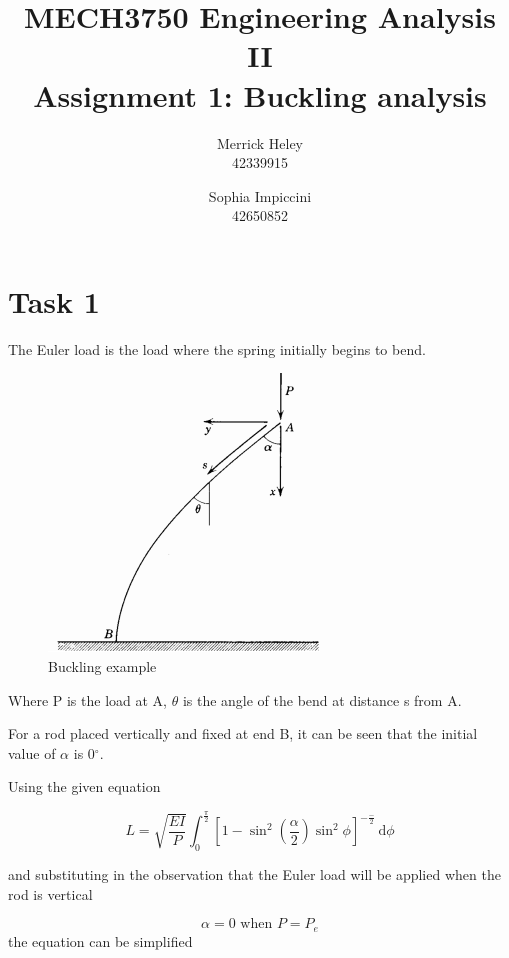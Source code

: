 \documentclass[a4paper,11pt,titlepage]{article}
\title{
MECH3750 Engineering Analysis II \\ 
Assignment 1: Buckling analysis
}
\author{
Merrick Heley\\
42339915
\and
Sophia Impiccini\\
42650852
}
\newcommand{\ud}{\,\mathrm{d}}
\begin{document}
\maketitle

\section*{Task 1}

The Euler load is the load where the spring initially begins to bend.

\begin{figure}[!hbp]
\centering
\includegraphics{buckling.png}
\caption{Buckling example}
\end{figure}

Where P is the load at A, $\theta$ is the angle of the bend at distance s 
from A.

For a rod placed vertically and fixed at end B, it can be seen that the initial
value of $\alpha$ is 0$^\circ$.

Using the given equation

\begin{equation}
L = 
\sqrt{\frac{EI}{P}} 
\int_0^{\frac{\pi}{2}} 
    {\displaystyle{\left[
        1-\sin^2{\left(\frac{\alpha}{2}\right)}\sin^2{\phi}
    \right]^{-\frac{-}{2}}}}
\ud \phi \label{eq:L}
\end{equation}

and substituting in the observation that the Euler load will be applied when the
rod is vertical

\begin{equation}
\alpha = 0 \text{ when } P = P_e
\end{equation}
the equation can be simplified 
\end{document}
